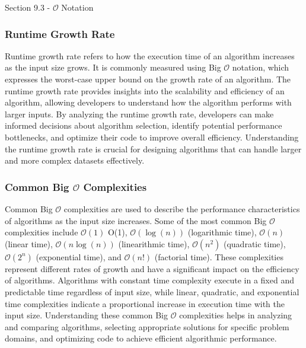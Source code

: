 \begin{notes}{Section 9.3 - $\mathcal{O}$ Notation}
    \subsubsection*{Runtime Growth Rate}
    
    Runtime growth rate refers to how the execution time of an algorithm increases as the input size grows. It is commonly measured using Big $\mathcal{O}$ notation, which expresses the worst-case upper bound on the growth rate of an algorithm. The runtime growth rate provides insights into the scalability and efficiency of an algorithm, allowing developers to understand how the algorithm performs with larger inputs. By analyzing the runtime 
    growth rate, developers can make informed decisions about algorithm selection, identify potential performance bottlenecks, and optimize their code to improve overall efficiency. Understanding the runtime growth rate is crucial for designing algorithms that can handle larger and more complex datasets effectively.
    
    \subsubsection*{Common Big $\mathcal{O}$ Complexities}
    
    Common Big $\mathcal{O}$ complexities are used to describe the performance characteristics of algorithms as the input size increases. Some of the most common Big $\mathcal{O}$ complexities include $\mathcal{O}(1)$ O(1), $\mathcal{O}(\log{(n)})$ (logarithmic time), $\mathcal{O}(n)$ (linear time), $\mathcal{O}(n\log{(n)})$ (linearithmic time), $\mathcal{O}(n^2)$ (quadratic time), $\mathcal{O}(2^n)$ (exponential time), and $\mathcal{O}(n!)$
    (factorial time). These complexities represent different rates of growth and have a significant impact on the efficiency of algorithms. Algorithms with constant time complexity execute in a fixed and predictable time regardless of input size, while linear, quadratic, and exponential time complexities indicate a proportional increase in execution time with the input size. Understanding these common Big $\mathcal{O}$ complexities helps in 
    analyzing and comparing algorithms, selecting appropriate solutions for specific problem domains, and optimizing code to achieve efficient algorithmic performance.
    

\end{notes}
